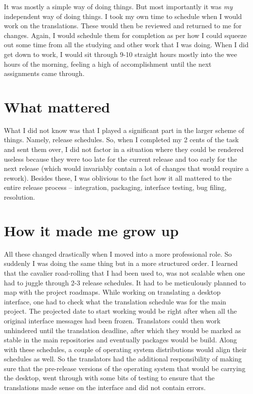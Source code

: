 It was mostly a simple way of doing things. But most importantly it was
\textit{my} independent way of doing things. I took my own time to schedule when
I would work on the translations. These would then be reviewed and returned to
me for changes. Again, I would schedule them for completion as per how I could
squeeze out some time from all the studying and other work that I was doing.
When I did get down to work, I would sit through 9-10 straight hours mostly into
the wee hours of the morning, feeling a high of accomplishment until the next
assignments came through.

\section*{What mattered}

What I did not know was that I played a significant part in the larger scheme of
things. Namely, release schedules. So, when I completed my 2 cents of the task
and sent them over, I did not factor in a situation where they could be rendered
useless because they were too late for the current release and too early for the
next release (which would invariably contain a lot of changes that would require
a rework). Besides these, I was oblivious to the fact how it all mattered to the
entire release process -- integration, packaging, interface testing, bug filing,
resolution.

\section*{How it made me grow up}

All these changed drastically when I moved into a more professional role. So
suddenly I was doing the same thing but in a more structured order. I learned
that the cavalier road-rolling that I had been used to, was not scalable when
one had to juggle through 2-3 release schedules. It had to be meticulously
planned to map with the project roadmaps. While working on translating a desktop
interface, one had to check what the translation schedule was for the main
project. The projected date to start working would be right after when all the
original interface messages had been frozen. Translators could then work
unhindered until the translation deadline, after which they would be marked as
stable in the main repositories and eventually packages would be build. Along
with these schedules, a couple of operating system
distributions would align their schedules as well. So the translators had the
additional responsibility of making sure that the pre-release versions of the
operating system that would be carrying the desktop, went through with some bits
of testing to ensure that the translations made sense on the interface and did
not contain errors.

